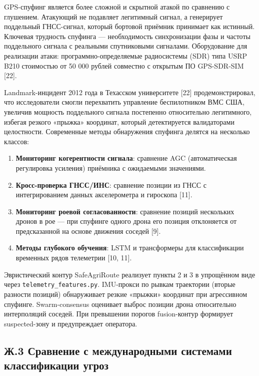 \documentclass[14pt,a4paper]{extarticle}
\providecommand{\tightlist}{%
  \setlength{\itemsep}{0pt}\setlength{\parskip}{0pt}}
\begin{document}
GPS-спуфинг является более сложной и скрытной атакой по сравнению с глушением. Атакующий не подавляет легитимный сигнал, а генерирует поддельный ГНСС-сигнал, который бортовой приёмник принимает как истинный. Ключевая трудность спуфинга --- необходимость синхронизации фазы и частоты поддельного сигнала с реальными спутниковыми сигналами. Оборудование для реализации атаки: программно-определяемые радиосистемы (SDR) типа USRP B210 стоимостью от 50 000 рублей совместно с открытым ПО GPS-SDR-SIM {[}22{]}.

Landmark-инцидент 2012 года в Техасском университете {[}22{]} продемонстрировал, что исследователи смогли перехватить управление беспилотником ВМС США, увеличив мощность поддельного сигнала постепенно относительно легитимного, избегая резкого «прыжка» координат, который детектируется валидаторами целостности. Современные методы обнаружения спуфинга делятся на несколько классов:

\begin{enumerate}
\def\labelenumi{\arabic{enumi}.}
\tightlist
\item
  \textbf{Мониторинг когерентности сигнала}: сравнение AGC (автоматическая регулировка усиления) приёмника с ожидаемыми значениями.
\item
  \textbf{Кросс-проверка ГНСС/ИНС}: сравнение позиции из ГНСС с интегрированием данных акселерометра и гироскопа {[}11{]}.
\item
  \textbf{Мониторинг роевой согласованности}: сравнение позиций нескольких дронов в рое --- при спуфинге одного дрона его позиция отклоняется от предсказанной на основе движения соседей {[}9{]}.
\item
  \textbf{Методы глубокого обучения}: LSTM и трансформеры для классификации временных рядов телеметрии {[}10, 11{]}.
\end{enumerate}

Эвристический контур SafeAgriRoute реализует пункты 2 и 3 в упрощённом виде через \texttt{telemetry\_features.py}. IMU-прокси по рывкам траектории (вторые разности позиций) обнаруживает резкие «прыжки» координат при агрессивном спуфинге. Swarm-consensus оценивает выброс позиции дрона относительно интерполяций соседей. При превышении порогов fusion-контур формирует suspected-зону и предупреждает оператора.

\hypertarget{ux436.3-ux441ux440ux430ux432ux43dux435ux43dux438ux435-ux441-ux43cux435ux436ux434ux443ux43dux430ux440ux43eux434ux43dux44bux43cux438-ux441ux438ux441ux442ux435ux43cux430ux43cux438-ux43aux43bux430ux441ux441ux438ux444ux438ux43aux430ux446ux438ux438-ux443ux433ux440ux43eux437}{%
\subsection{Ж.3 Сравнение с международными системами классификации угроз}\label{ux436.3-ux441ux440ux430ux432ux43dux435ux43dux438ux435-ux441-ux43cux435ux436ux434ux443ux43dux430ux440ux43eux434ux43dux44bux43cux438-ux441ux438ux441ux442ux435ux43cux430ux43cux438-ux43aux43bux430ux441ux441ux438ux444ux438ux43aux430ux446ux438ux438-ux443ux433ux440ux43eux437}}
\end{document}

